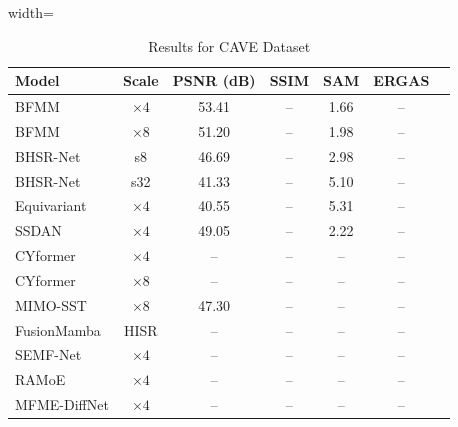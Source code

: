 \documentclass[conference]{IEEEtran}
\begin{document}
\begin{table}[htbp]
\caption{Results for CAVE Dataset \cite{cave_dataset}}
\begin{center}
\begin{adjustbox}{width=\columnwidth}
\begin{tabular}{lcccccc}
\toprule
\textbf{Model} & \textbf{Scale} & \textbf{PSNR (dB)} & \textbf{SSIM} & \textbf{SAM} & \textbf{ERGAS} \\
\midrule
BFMM \cite{li2026bfmm} & $\times 4$ & 53.41 & -- & 1.66 & -- \\
BFMM \cite{li2026bfmm} & $\times 8$ & 51.20 & -- & 1.98 & -- \\
BHSR-Net \cite{dou2026bhsrnet} & s8 & 46.69 & -- & 2.98 & -- \\
BHSR-Net \cite{dou2026bhsrnet} & s32 & 41.33 & -- & 5.10 & -- \\
Equivariant \cite{wang2026equivariant} & $\times 4$ & 40.55 & -- & 5.31 & -- \\
SSDAN \cite{ssdan2026} & $\times 4$ & 49.05 & -- & 2.22 & -- \\
CYformer \cite{chen2025cyformer} & $\times 4$ & -- & -- & -- & -- \\
CYformer \cite{chen2025cyformer} & $\times 8$ & -- & -- & -- & -- \\
MIMO-SST \cite{fang2024mimosst} & $\times 8$ & 47.30 & -- & -- & -- \\
FusionMamba \cite{peng2024fusionmamba} & HISR & -- & -- & -- & -- \\
SEMF-Net \cite{semfnet2026} & $\times 4$ & -- & -- & -- & -- \\
RAMoE \cite{ramoe2026} & $\times 4$ & -- & -- & -- & -- \\
MFME-DiffNet \cite{mfme2026} & $\times 4$ & -- & -- & -- & -- \\
\bottomrule
\end{tabular}
\end{adjustbox}
\label{tab:cave}
\end{center}
\end{table}
\end{document}
